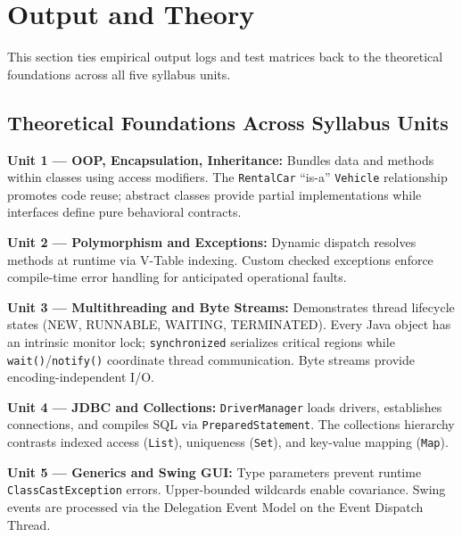 \documentclass[11pt,a4paper]{article}
\begin{document}
\newpage
\section{Output and Theory}
\label{sec:output}

This section ties empirical output logs and test matrices back to the theoretical foundations across all five syllabus units.

\subsection{Theoretical Foundations Across Syllabus Units}

\textbf{Unit 1 --- OOP, Encapsulation, Inheritance:} Bundles data and methods within classes using access modifiers. The \texttt{RentalCar} ``is-a'' \texttt{Vehicle} relationship promotes code reuse; abstract classes provide partial implementations while interfaces define pure behavioral contracts.

\textbf{Unit 2 --- Polymorphism and Exceptions:} Dynamic dispatch resolves methods at runtime via V-Table indexing. Custom checked exceptions enforce compile-time error handling for anticipated operational faults.

\textbf{Unit 3 --- Multithreading and Byte Streams:} Demonstrates thread lifecycle states (NEW, RUNNABLE, WAITING, TERMINATED). Every Java object has an intrinsic monitor lock; \texttt{synchronized} serializes critical regions while \texttt{wait()}/\texttt{notify()} coordinate thread communication. Byte streams provide encoding-independent I/O.

\textbf{Unit 4 --- JDBC and Collections:} \texttt{DriverManager} loads drivers, establishes connections, and compiles SQL via \texttt{PreparedStatement}. The collections hierarchy contrasts indexed access (\texttt{List}), uniqueness (\texttt{Set}), and key-value mapping (\texttt{Map}).

\textbf{Unit 5 --- Generics and Swing GUI:} Type parameters prevent runtime \texttt{ClassCastException} errors. Upper-bounded wildcards enable covariance. Swing events are processed via the Delegation Event Model on the Event Dispatch Thread.
\end{document}

